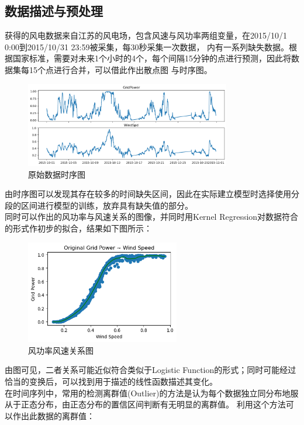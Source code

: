 \documentclass{ctexart}
\begin{document}
\subsection{数据描述与预处理}
获得的风电数据来自江苏的风电场，包含风速与风功率两组变量，在2015/10/1 0:00到2015/10/31 23:59被采集，每30秒采集一次数据，
内有一系列缺失数据。根据国家标准，需要对未来1个小时的4个，每个间隔15分钟的点进行预测，因此将数据集每15个点进行合并，可以借此作出散点图
与时序图。\\
\begin{figure}[htbp]
    \centering
    \includegraphics[width=0.80\textwidth]{photos/original_time_series.png}
    \caption{原始数据时序图}
\end{figure}
由时序图可以发现其存在较多的时间缺失区间，因此在实际建立模型时选择使用分段的区间进行模型的训练，放弃具有缺失值的部分。\\
\indent 同时可以作出的风功率与风速关系的图像，并同时用Kernel Regression对数据符合的形式作初步的拟合，结果如下图所示：\\
\begin{figure}[htbp]
    \centering
    \includegraphics[width = 0.6\textwidth]{photos/scatter_fitted.png}
    \caption{风功率风速关系图}
\end{figure}
由图可见，二者关系可能近似符合类似于Logistic Function的形式；同时可能经过恰当的变换后，可以找到用于描述的线性函数描述其变化。\\
\indent 在时间序列中，常用的检测离群值(Outlier)的方法是认为每个数据独立同分布地服从于正态分布，由正态分布的置信区间判断有无明显的离群值。
利用这个方法可以作出此数据的离群值：\\
\end{document}
